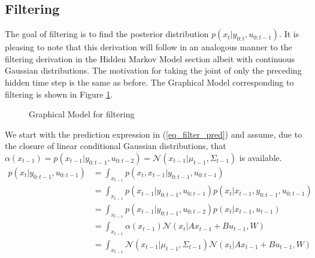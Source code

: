 \subsection{Filtering}
The goal of filtering is to find the posterior distribution $p(x_{t}|y_{0:t}, u_{0:t-1})$. It is pleasing to note that this derivation will follow in an analogous manner to the filtering derivation in the Hidden Markov Model section albeit with continuous Gaussian distributions. The motivation for taking the joint of only the preceding hidden time step is the same as before. The Graphical Model corresponding to filtering is shown in Figure \ref{fig_gm_linmods_filtering}.
\begin{figure}[H] 
\centering
{}
\caption{Graphical Model for filtering}
\label{fig_gm_linmods_filtering}
\end{figure}
We start with the prediction expression in (\ref{eq_filter_pred}) and assume, due to the closure of linear conditional Gaussian distributions, that $\alpha(x_{t-1}) = p(x_{t-1}|y_{0:t-1}, u_{0:t-2}) = \mathcal{N}(x_{t-1}|\mu_{t-1}, \Sigma_{t-1}) $ is available. 
\begin{equation}
\begin{aligned}
p(x_t|y_{0:t-1}, u_{0:t-1}) &= \int_{x_{t-1}} p(x_t,x_{t-1}|y_{0:t-1}, u_{0:t-1}) \\
&= \int_{x_{t-1}} p(x_{t-1}|y_{0:t-1}, u_{0:t-1})p(x_{t}|x_{t-1}, y_{0:t-1}, u_{0:t-1}) \\
&= \int_{x_{t-1}} p(x_{t-1}|y_{0:t-1}, u_{0:t-2})p(x_{t}|x_{t-1}, u_{t-1}) \\
&= \int_{x_{t-1}} \alpha(x_{t-1})\mathcal{N}(x_{t}|Ax_{t-1}+Bu_{t-1}, W) \\
&= \int_{x_{t-1}} \mathcal{N}(x_{t-1}|\mu_{t-1}, \Sigma_{t-1}) \mathcal{N}(x_{t}|Ax_{t-1}+Bu_{t-1}, W) \\
\end{aligned}
\label{eq_filter_pred}
\end{equation} 
